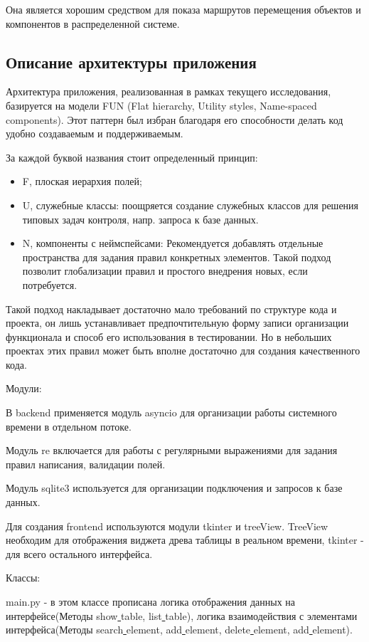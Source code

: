 Она является хорошим средством для показа маршрутов перемещения объектов и компонентов в распределенной системе.

\subsection{Описание архитектуры приложения}

Архитектура приложения, реализованная в рамках текущего исследования, базируется на модели FUN (Flat hierarchy, Utility styles,  Name-spaced components). 
Этот паттерн был избран благодаря его способности делать код удобно создаваемым и поддерживаемым.

За каждой буквой названия стоит определенный принцип:

\begin{itemize}
	\item F, плоская иерархия полей;
	\item U, служебные классы: поощряется создание служебных классов для решения типовых задач контроля, напр. запроса к базе данных.
	\item N, компоненты с неймспейсами: Рекомендуется добавлять отдельные пространства для задания правил конкретных элементов. Такой подход позволит глобализации правил и простого внедрения новых, если потребуется.
\end{itemize}

Такой подход накладывает достаточно мало требований по структуре кода и проекта, он лишь устанавливает предпочтительную форму записи организации функционала и способ его использования в тестировании. Но в небольших проектах этих правил может быть вполне достаточно для создания качественного кода.

Модули:

В backend применяется модуль asyncio для организации работы системного времени в отдельном потоке.

Модуль re включается для работы с регулярными выражениями для задания правил написания, валидации полей.

Модуль sqlite3 используется для организации подключения и запросов к базе данных.

Для создания frontend используются модули tkinter и treeView. TreeView необходим для отображения виджета древа таблицы в реальном времени, tkinter - для всего остального интерфейса.

Классы:

main.py - в этом классе прописана логика отображения данных на интерфейсе(Методы show\underline{ }table, list\underline{ }table), логика взаимодействия с элементами интерфейса(Методы search\underline{ }element, add\underline{ }element, delete\underline{ }element, add\underline{ }element).

